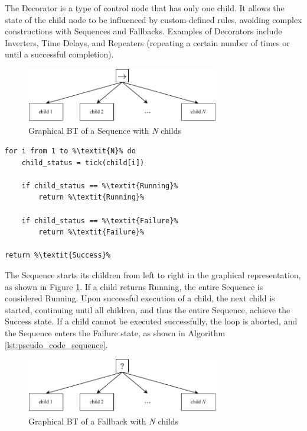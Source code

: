The Decorator is a type of control node that has only one child. It allows the state of the child node to be influenced by custom-defined rules, avoiding complex constructions with Sequences and Fallbacks. Examples of Decorators include Inverters, Time Delays, and Repeaters (repeating a certain number of times or until a successful completion).

\begin{figure}[h]
    \centering
    \includegraphics[width=0.75\textwidth]{figures/02_state_of_the_art/sequence.pdf}
    \caption{Graphical BT of a Sequence with \textit{N} childs}
    \label{fig:sequence}
\end{figure}

\begin{lstlisting}[float=h]
for i from 1 to %\textit{N}% do
    child_status = tick(child[i])
    
    if child_status == %\textit{Running}%
        return %\textit{Running}%
        
    if child_status == %\textit{Failure}%
        return %\textit{Failure}%

return %\textit{Success}%
\end{lstlisting}

The Sequence starts its children from left to right in the graphical representation, as shown in Figure \ref{fig:sequence}. If a child returns Running, the entire Sequence is considered Running. Upon successful execution of a child, the next child is started, continuing until all children, and thus the entire Sequence, achieve the Success state. If a child cannot be executed successfully, the loop is aborted, and the Sequence enters the Failure state, as shown in Algorithm \ref{lst:pseudo_code_sequence}.
  

\begin{figure}[h]
    \centering
    \includegraphics[width=0.75\textwidth]{figures/02_state_of_the_art/fallback.pdf}
    \caption{Graphical BT of a Fallback with \textit{N} childs}
    \label{fig:fallback}
  \end{figure}
  

